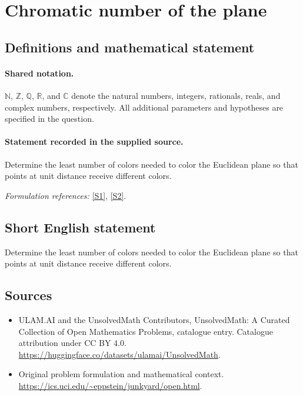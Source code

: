 \documentclass[11pt]{article}
\newcommand{\sref}[2]{\hyperlink{source:#1:#2}{[S#2]}}
\begin{document}
\section{Chromatic number of the plane}\label{statement}

\subsection{Definitions and mathematical statement}

\paragraph{Shared notation.}$\mathbb N$, $\mathbb Z$, $\mathbb Q$, $\mathbb R$, and $\mathbb C$ denote the natural numbers, integers, rationals, reals, and complex numbers, respectively. All additional parameters and hypotheses are specified in the question.


\paragraph{Statement recorded in the supplied source.}
Determine the least number of colors needed to color the Euclidean plane so that points at unit distance receive different colors.
\par\smallskip\textit{Formulation references:} \sref{statement}{1}, \sref{statement}{2}.
\subsection{Short English statement}
Determine the least number of colors needed to color the Euclidean plane so that points at unit distance receive different colors.
\subsection{Sources}
\begin{itemize}
\item[\hypertarget{source:statement:1}{S1}] ULAM.AI and the UnsolvedMath Contributors, UnsolvedMath: A Curated Collection of Open Mathematics Problems, catalogue entry. Catalogue attribution under CC BY 4.0.
\url{https://huggingface.co/datasets/ulamai/UnsolvedMath}.
\item[\hypertarget{source:statement:2}{S2}] Original problem formulation and mathematical context.
\url{https://ics.uci.edu/~eppstein/junkyard/open.html}.
\end{itemize}
\label{end:statement}
\end{document}
